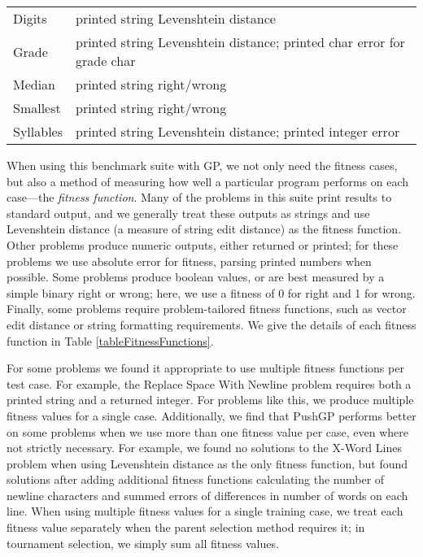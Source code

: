 \documentclass{sig-alternate}
\begin{document}
\begin{table*}[t]
\begin{tabular}{>{\raggedright}p{4cm} >{\raggedright}p{11cm}}
Digits                     & printed string Levenshtein distance                                                                                                   \tabularnewline
Grade                      & printed string Levenshtein distance; printed char error for grade char \tabularnewline
Median                     & printed string right/wrong \tabularnewline
Smallest                   & printed string right/wrong \tabularnewline
Syllables                  & printed string Levenshtein distance; printed integer error  \tabularnewline     
\bottomrule
\end{tabular}
\end{table*}

When using this benchmark suite with GP, we not only need the fitness cases, but also a method of measuring how well a particular program performs on each case---the \textit{fitness function}. 
Many of the problems in this suite print results to standard output, and we generally treat these outputs as strings and use Levenshtein distance (a measure of string edit distance) as the fitness function. Other problems produce numeric outputs, either returned or printed; for these problems we use absolute error for fitness, parsing printed numbers when possible. Some problems produce boolean values, or are best measured by a simple binary right or wrong; here, we use a fitness of 0 for right and 1 for wrong. Finally, some problems require problem-tailored fitness functions, such as vector edit distance or string formatting requirements. We give the details of each fitness function in Table \ref{tableFitnessFunctions}.

For some problems we found it appropriate to use multiple fitness functions per test case. For example, the Replace Space With Newline problem requires both a printed string and a returned integer. For problems like this, we produce multiple fitness values for a single case. Additionally, we find that PushGP performs better on some problems when we use more than one fitness value per case, even where not strictly necessary. For example, we found no solutions to the X-Word Lines problem when using Levenshtein distance as the only fitness function, but found solutions after adding additional fitness functions calculating the number of newline characters and summed errors of differences in number of words on each line. When using multiple fitness values for a single training case, we treat each fitness value separately when the parent selection method requires it; in tournament selection, we simply sum all fitness values.
\end{document}
